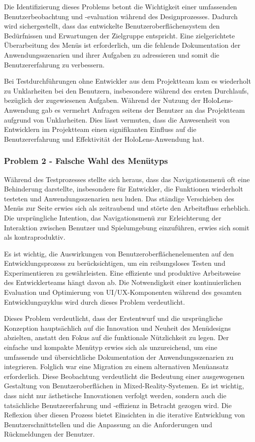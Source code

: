 Die Identifizierung dieses Problems betont die Wichtigkeit einer umfassenden Benutzerbeobachtung und -evaluation während des Designprozesses. Dadurch wird sichergestellt, dass das entwickelte Benutzeroberflächensystem den Bedürfnissen und Erwartungen der Zielgruppe entspricht. Eine zielgerichtete Überarbeitung des Menüs ist erforderlich, um die fehlende Dokumentation der Anwendungsszenarien und ihrer Aufgaben zu adressieren und somit die Benutzererfahrung zu verbessern.

Bei Testdurchführungen ohne Entwickler aus dem Projektteam kam es wiederholt zu Unklarheiten bei den Benutzern, insbesondere während des ersten Durchlaufs, bezüglich der zugewiesenen Aufgaben. Während der Nutzung der HoloLens-Anwendung gab es vermehrt Anfragen seitens der Benutzer an das Projektteam aufgrund von Unklarheiten. Dies lässt vermuten, dass die Anwesenheit von Entwicklern im Projektteam einen signifikanten Einfluss auf die Benutzererfahrung und Effektivität der HoloLens-Anwendung hat.


\subsubsection*{Problem 2 - Falsche Wahl des Menütyps}
Während des Testprozesses stellte sich heraus, dass das Navigationsmenü oft eine Behinderung darstellte, insbesondere für Entwickler, die Funktionen wiederholt testeten und Anwendungsszenarien neu luden. Das ständige Verschieben des Menüs zur Seite erwies sich als zeitraubend und störte den Arbeitsfluss erheblich. Die ursprüngliche Intention, das Navigationsmenü zur Erleichterung der Interaktion zwischen Benutzer und Spielumgebung einzuführen, erwies sich somit als kontraproduktiv.

Es ist wichtig, die Auswirkungen von Benutzeroberflächenelementen auf den Entwicklungsprozess zu berücksichtigen, um ein reibungsloses Testen und Experimentieren zu gewährleisten. Eine effiziente und produktive Arbeitsweise des Entwicklerteams hängt davon ab. Die Notwendigkeit einer kontinuierlichen Evaluation und Optimierung von UI/UX-Komponenten während des gesamten Entwicklungszyklus wird durch dieses Problem verdeutlicht.

Dieses Problem verdeutlicht, dass der Erstentwurf und die ursprüngliche Konzeption hauptsächlich auf die Innovation und Neuheit des Menüdesigns abzielten, anstatt den Fokus auf die funktionale Nützlichkeit zu legen. Der einfache und kompakte Menütyp erwies sich als unzureichend, um eine umfassende und übersichtliche Dokumentation der Anwendungsszenarien zu integrieren. Folglich war eine Migration zu einem alternativen Menüansatz erforderlich. Diese Beobachtung verdeutlicht die Bedeutung einer ausgewogenen Gestaltung von Benutzeroberflächen in Mixed-Reality-Systemen. Es ist wichtig, dass nicht nur ästhetische Innovationen verfolgt werden, sondern auch die tatsächliche Benutzererfahrung und -effizienz in Betracht gezogen wird. Die Reflexion über diesen Prozess bietet Einsichten in die iterative Entwicklung von Benutzerschnittstellen und die Anpassung an die Anforderungen und Rückmeldungen der Benutzer.

